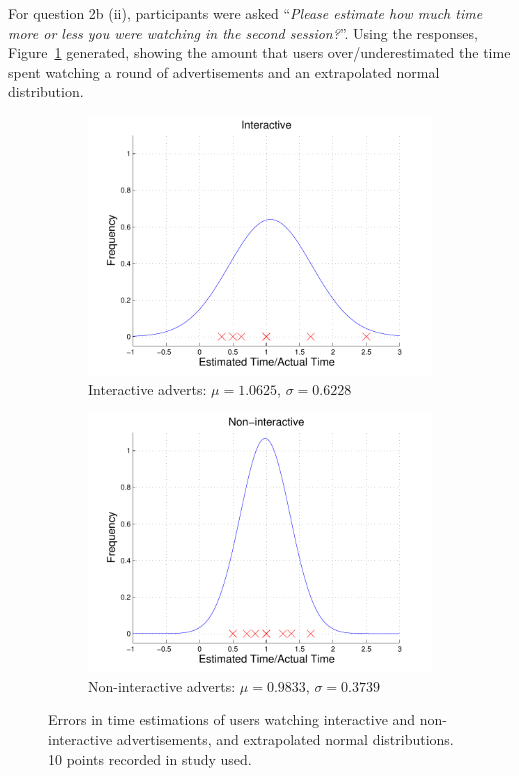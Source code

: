 	For question 2b (ii), participants were asked ``\textit{Please estimate how much time more or less you were watching in the second session?}''. Using the responses, Figure~\ref{fig:time_perception} generated, showing the amount that users over/underestimated the time spent watching a round of advertisements and an extrapolated normal distribution.
	\begin{figure}[h!]
		\centering
		\begin{subfigure}[h]{0.49\textwidth}
			\centering
			\includegraphics[width=\textwidth]{images/interactive_bell.pdf}
			\caption{Interactive adverts: $\mu=1.0625$, $\sigma=0.6228$}
		\end{subfigure}
		\begin{subfigure}[h]{0.49\textwidth}
			\centering
			\includegraphics[width=\textwidth]{images/noninteractive_bell.pdf}
			\caption{Non-interactive adverts: $\mu=0.9833$, $\sigma=0.3739$}
		\end{subfigure}
		\caption{Errors in time estimations of users watching interactive and non-interactive advertisements, and extrapolated normal distributions. 10 points recorded in study used.}
		\label{fig:time_perception}
	\end{figure}

